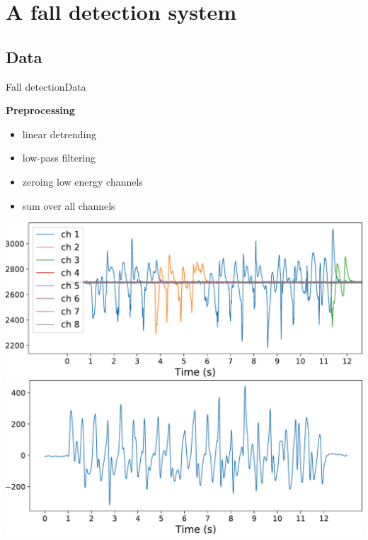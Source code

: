 \documentclass[8pt,t,aspectratio=1610]{beamer}
\begin{document}
\section{A fall detection system}
\subsection{Data}
\begin{frame}{Fall detection}{Data}
\begin{minipage}[t]{0.49\linewidth}
    \vspace{0pt}
        \textbf{Preprocessing}
        \begin{itemize}
            \item linear detrending
            \item low-pass filtering
            \item zeroing low energy channels
            \item sum over all channels
        \end{itemize}
    \medskip
    \begin{overprint}
            \includegraphics[trim= 0 0 0 0, width=0.8\linewidth, clip]{ex_signal_raw_2.pdf}
            \includegraphics[trim= 0 0 0 0, width=0.8\linewidth, clip]{ex_signal_preproc_2.pdf}

\end{overprint}
\end{minipage}
\end{frame}
\end{document}
